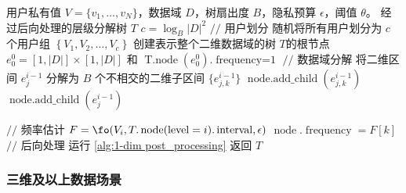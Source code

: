 \begin{algorithm}[!htbp]
    \caption{构建二维\myahead 层级分解树}
    \label{Construct 2-dim prototype tree}
	\begin{algorithmic}[1]
        \REQUIRE 用户私有值 $V=\{v_1, \ldots, v_N\}$，数据域 $D$，树扇出度 $B$，隐私预算 $\epsilon$，阈值 $\theta$。
        \ENSURE 经过后向处理的\myahead 层级分解树 $T$
		\STATE $c = {\log_B}|D|^2$
        \STATE $//$ 用户划分
        \STATE 随机将所有用户划分为 $c$ 个用户组 $\left\{ V_1, V_2, \ldots, V_c \right\}$
        \STATE 创建表示整个二维数据域的树 $T$的根节点 $e^0_0 = [1, |D|] \times [1, |D|]$ 和 $\operatorname{T.node}(e^0_0).\operatorname{frequency = 1}$
            \STATE $//$ 数据域分解
            \STATE 将二维区间 $e^{i-1}_j$ 分解为 $B$ 个不相交的二维子区间 $\{e^{i-1}_{j,k}\}$
    		\STATE $\operatorname{node.add\_child}(e^{i-1}_{j,k})$
            \ENDFOR
            \ELSE
            \STATE $\operatorname{node.add\_child}(e^{i-1}_{j})$
            \ENDIF 		
            \ENDFOR

            \STATE $//$ 频率估计
            \STATE $F = \fo(V_i, T.\operatorname{node}(\operatorname{level}=i).\operatorname{interval}, \epsilon)$
    		\STATE $\operatorname{node}.\operatorname{frequency} = F[k]$
            \ENDFOR
        \ENDFOR
        \STATE $//$ 后向处理
        \STATE 运行 \autoref{alg:1-dim post_processing}
        \STATE 返回 $T$
	\end{algorithmic}
\end{algorithm}

\subsubsection{三维及以上数据场景}

